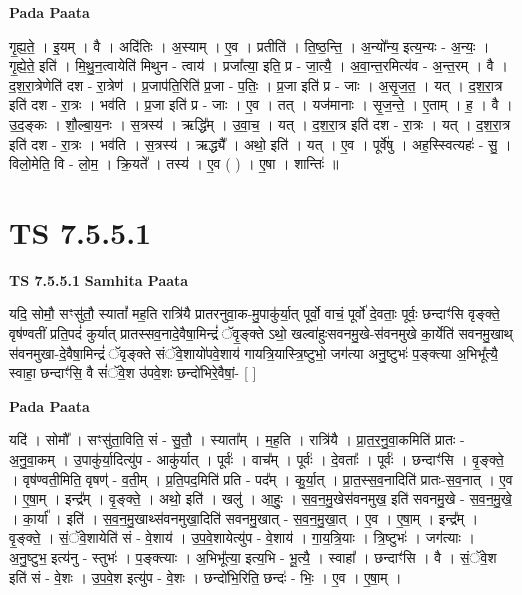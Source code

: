 \documentclass[17pt]{extarticle}
\begin{document}
\textbf{Pada Paata} \newline

गृ॒ह्य॒ते॒ । इ॒यम् । वै । अदि॑तिः । अ॒स्याम् । ए॒व । प्रतीति॑ । ति॒ष्ठ॒न्ति॒ । अ॒न्यो᳚न्य॒ इत्य॒न्यः - अ॒न्यः॒ । गृ॒ह्ये॒ते॒ इति॑ । मि॒थु॒न॒त्वायेति॑ मिथुन - त्वाय॑ । प्रजा᳚त्या॒ इति॒ प्र - जा॒त्यै॒ । अ॒वा॒न्त॒रमित्य॑व - अ॒न्त॒रम् । वै । द॒श॒रा॒त्रेणेति॑ दश - रा॒त्रेण॑ । प्र॒जाप॑ति॒रिति॑ प्र॒जा - प॒तिः॒ । प्र॒जा इति॑ प्र - जाः । अ॒सृ॒ज॒त॒ । यत् । द॒श॒रा॒त्र इति॑ दश - रा॒त्रः । भव॑ति । प्र॒जा इति॑ प्र - जाः । ए॒व । तत् । यज॑मानाः । सृ॒ज॒न्ते॒ । ए॒ताम् । ह॒ । वै । उ॒द॒ङ्कः । शौ॒ल्बा॒य॒नः । स॒त्रस्य॑ । ऋद्धि᳚म् । उ॒वा॒च॒ । यत् । द॒श॒रा॒त्र इति॑ दश - रा॒त्रः । यत् । द॒श॒रा॒त्र इति॑ दश - रा॒त्रः । भव॑ति । स॒त्रस्य॑ । ऋद्ध्यै᳚ । अथो॒ इति॑ । यत् । ए॒व । पूर्वे॑षु । अह॒स्स्वित्यहः॑ - सु॒ । विलो॒मेति॒ वि - लो॒म॒ । क्रि॒यते᳚ । तस्य॑ । ए॒व ( ) । ए॒षा । शान्तिः॑ ॥  \newline




\section*{ TS 7.5.5.1 }

\textbf{TS 7.5.5.1 } \newline
\textbf{Samhita Paata} \newline

यदि॒ सोमौ॒ सꣳसु॑तौ॒ स्यातां᳚ मह॒ति रात्रि॑यै प्रातरनुवा॒क-मु॒पाकु॑र्या॒त् पूर्वो॒ वाचं॒ पूर्वो॑ दे॒वताः॒ पूर्वः॒ छन्दाꣳ॑सि वृङ्क्ते॒ वृष॑ण्वतीं प्रति॒पदं॑ कुर्यात् प्रातस्सव॒नादे॒वैषा॒मिन्द्रं॑ ॅवृ॒ङ्क्ते ऽथो॒ खल्वा॑हुःसवनमु॒खे-स॑वनमुखे का॒र्येति॑ सवनमु॒खाथ् स॑वनमुखा-दे॒वैषा॒मिन्द्रं॑ ॅवृङ्क्ते संॅवे॒शायो॑पवे॒शाय॑ गायत्रि॒यास्त्रि॒ष्टुभो॒ जग॑त्या अनु॒ष्टुभः॑ प॒ङ्क्त्या अ॒भिभू᳚त्यै॒ स्वाहा॒ छन्दाꣳ॑सि॒ वै सं॑ॅवे॒श उ॑पवे॒शः छन्दो॑भिरे॒वैषां॒- [  ] \newline

\textbf{Pada Paata} \newline

यदि॑ । सोमौ᳚ । सꣳसु॑ता॒विति॒ सं - सु॒तौ॒ । स्याता᳚म् । म॒ह॒ति । रात्रि॑यै । प्रा॒त॒र॒नु॒वा॒कमिति॑ प्रातः - अ॒नु॒वा॒कम् । उ॒पाकु॑र्या॒दित्यु॑प - आकु॑र्यात् । पूर्वः॑ । वाच᳚म् । पूर्वः॑ । दे॒वताः᳚ । पूर्वः॑ । छन्दाꣳ॑सि । वृ॒ङ्क्ते॒ । वृष॑ण्वती॒मिति॒ वृषण्॑ - व॒ती॒म् । प्र॒ति॒पद॒मिति॑ प्रति - पद᳚म् । कु॒र्या॒त् । प्रा॒त॒स्स॒व॒नादिति॑ प्रातः-स॒व॒नात् । ए॒व । ए॒षा॒म् । इन्द्र᳚म् । वृ॒ङ्क्ते॒ । अथो॒ इति॑ । खलु॑ । आ॒हुः॒ । स॒व॒न॒मु॒खेस॑वनमुख॒ इति॑ सवनमु॒खे - स॒व॒न॒मु॒खे॒ । का॒र्या᳚ । इति॑ । स॒व॒न॒मु॒खाथ्स॑वनमुखा॒दिति॑ सवनमु॒खात् - स॒व॒न॒मु॒खा॒त् । ए॒व । ए॒षा॒म् । इन्द्र᳚म् । वृ॒ङ्क्ते॒ । सं॒ॅवे॒शायेति॑ सं - वे॒शाय॑ । उ॒प॒वे॒शायेत्यु॑प - वे॒शाय॑ । गा॒य॒त्रि॒याः । त्रि॒ष्टुभः॑ । जग॑त्याः । अ॒नु॒ष्टुभ॒ इत्य॑नु - स्तुभः॑ । प॒ङ्क्त्याः । अ॒भिभू᳚त्या॒ इत्य॒भि - भू॒त्यै॒ । स्वाहा᳚ । छन्दाꣳ॑सि । वै । सं॒ॅवे॒श इति॑ सं - वे॒शः । उ॒प॒वे॒श इत्यु॑प - वे॒शः । छन्दो॑भि॒रिति॒ छन्दः॑ - भिः॒ । ए॒व । ए॒षा॒म् ।  \newline
\end{document}
